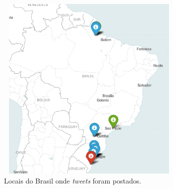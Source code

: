     \begin{figure}[h]
        \centering
        \includegraphics[width=9cm, height=9cm]{imagens/mapa.png}
        \caption {Locais do Brasil onde \textit{tweets} foram postados.}
        \label{fig:mapa}
    \end{figure}

    



        











